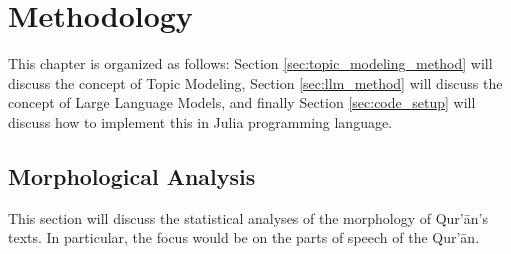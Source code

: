 
\chapter{Methodology}\label{ch:methodology}
This chapter is organized as follows: Section \ref{sec:topic_modeling_method} will discuss the concept of Topic Modeling, Section \ref{sec:llm_method} will discuss the concept of Large Language Models, and finally Section \ref{sec:code_setup} will discuss how to implement this in Julia programming language.
\section{Morphological Analysis}
This section will discuss the statistical analyses of the morphology of Qur'\=an's texts. In particular, the focus would be on the parts of speech of the Qur'\=an.
